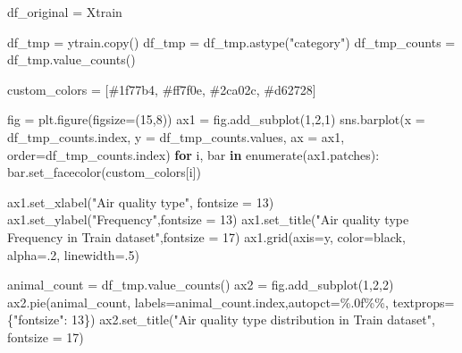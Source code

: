 \documentclass[
  letterpaper,
  DIV=11,
  numbers=noendperiod]{scrartcl}
\newenvironment{Shaded}{\begin{snugshade}}{\end{snugshade}}
\newcommand{\BuiltInTok}[1]{\textcolor[rgb]{0.00,0.23,0.31}{#1}}
\newcommand{\ControlFlowTok}[1]{\textcolor[rgb]{0.00,0.23,0.31}{\textbf{#1}}}
\newcommand{\DecValTok}[1]{\textcolor[rgb]{0.68,0.00,0.00}{#1}}
\newcommand{\FloatTok}[1]{\textcolor[rgb]{0.68,0.00,0.00}{#1}}
\newcommand{\KeywordTok}[1]{\textcolor[rgb]{0.00,0.23,0.31}{\textbf{#1}}}
\newcommand{\NormalTok}[1]{\textcolor[rgb]{0.00,0.23,0.31}{#1}}
\newcommand{\OperatorTok}[1]{\textcolor[rgb]{0.37,0.37,0.37}{#1}}
\newcommand{\SpecialCharTok}[1]{\textcolor[rgb]{0.37,0.37,0.37}{#1}}
\newcommand{\StringTok}[1]{\textcolor[rgb]{0.13,0.47,0.30}{#1}}
\begin{document}
\begin{Shaded}
\begin{Highlighting}[]
\NormalTok{df\_original }\OperatorTok{=}\NormalTok{ Xtrain}

\NormalTok{df\_tmp }\OperatorTok{=}\NormalTok{ ytrain.copy()}
\NormalTok{df\_tmp }\OperatorTok{=}\NormalTok{ df\_tmp.astype(}\StringTok{"category"}\NormalTok{)}
\NormalTok{df\_tmp\_counts }\OperatorTok{=}\NormalTok{ df\_tmp.value\_counts()}


\NormalTok{custom\_colors }\OperatorTok{=}\NormalTok{ [}\StringTok{\textquotesingle{}\#1f77b4\textquotesingle{}}\NormalTok{, }\StringTok{\textquotesingle{}\#ff7f0e\textquotesingle{}}\NormalTok{, }\StringTok{\textquotesingle{}\#2ca02c\textquotesingle{}}\NormalTok{, }\StringTok{\textquotesingle{}\#d62728\textquotesingle{}}\NormalTok{]}

\NormalTok{fig }\OperatorTok{=}\NormalTok{ plt.figure(figsize}\OperatorTok{=}\NormalTok{(}\DecValTok{15}\NormalTok{,}\DecValTok{8}\NormalTok{))}
\NormalTok{ax1 }\OperatorTok{=}\NormalTok{ fig.add\_subplot(}\DecValTok{1}\NormalTok{,}\DecValTok{2}\NormalTok{,}\DecValTok{1}\NormalTok{)}
\NormalTok{sns.barplot(x }\OperatorTok{=}\NormalTok{ df\_tmp\_counts.index, y }\OperatorTok{=}\NormalTok{ df\_tmp\_counts.values, ax }\OperatorTok{=}\NormalTok{ ax1, order}\OperatorTok{=}\NormalTok{df\_tmp\_counts.index)}
\ControlFlowTok{for}\NormalTok{ i, bar }\KeywordTok{in} \BuiltInTok{enumerate}\NormalTok{(ax1.patches):}
\NormalTok{    bar.set\_facecolor(custom\_colors[i])}

\NormalTok{ax1.set\_xlabel(}\StringTok{"Air quality type"}\NormalTok{, fontsize }\OperatorTok{=} \DecValTok{13}\NormalTok{)}
\NormalTok{ax1.set\_ylabel(}\StringTok{"Frequency"}\NormalTok{,fontsize }\OperatorTok{=} \DecValTok{13}\NormalTok{)}
\NormalTok{ax1.set\_title(}\StringTok{"Air quality type Frequency in Train dataset"}\NormalTok{,fontsize }\OperatorTok{=} \DecValTok{17}\NormalTok{)}
\NormalTok{ax1.grid(axis}\OperatorTok{=}\StringTok{\textquotesingle{}y\textquotesingle{}}\NormalTok{, color}\OperatorTok{=}\StringTok{\textquotesingle{}black\textquotesingle{}}\NormalTok{, alpha}\OperatorTok{=}\FloatTok{.2}\NormalTok{, linewidth}\OperatorTok{=}\FloatTok{.5}\NormalTok{)}

\NormalTok{animal\_count }\OperatorTok{=}\NormalTok{ df\_tmp.value\_counts()}
\NormalTok{ax2 }\OperatorTok{=}\NormalTok{ fig.add\_subplot(}\DecValTok{1}\NormalTok{,}\DecValTok{2}\NormalTok{,}\DecValTok{2}\NormalTok{)}
\NormalTok{ax2.pie(animal\_count, labels}\OperatorTok{=}\NormalTok{animal\_count.index,autopct}\OperatorTok{=}\StringTok{\textquotesingle{}\%.0f}\SpecialCharTok{\%\%}\StringTok{\textquotesingle{}}\NormalTok{, textprops}\OperatorTok{=}\NormalTok{\{}\StringTok{"fontsize"}\NormalTok{: }\DecValTok{13}\NormalTok{\})}
\NormalTok{ax2.set\_title(}\StringTok{"Air quality type distribution in Train dataset"}\NormalTok{, fontsize }\OperatorTok{=} \DecValTok{17}\NormalTok{)}
\end{Highlighting}
\end{Shaded}
\end{document}
